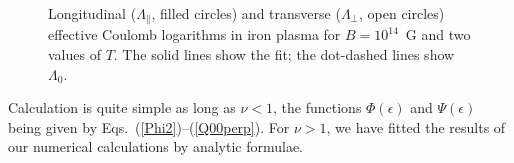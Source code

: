 \documentclass{aa}
\begin{document}
\begin{figure}
\begin{center}
 \leavevmode
\epsfysize=83mm
\end{center}
\caption[]{Longitudinal ($\Lambda_\|$, filled circles)
and transverse ($\Lambda_\perp$, open circles)
effective Coulomb logarithms in iron plasma
for $B=10^{14}$~G and two values of $T$.
The solid lines show the fit; the
dot-dashed lines show $\Lambda_0$.
}
\label{fig-b14a}
\end{figure}

Calculation is quite simple as long as $\nu < 1$,
the functions $\Phi(\epsilon)$ and $\Psi(\epsilon)$
being given by Eqs.~(\ref{Phi2})--(\ref{Q00perp}).
For $\nu > 1$, we have fitted
the results of our numerical calculations by analytic formulae.
\end{document}
